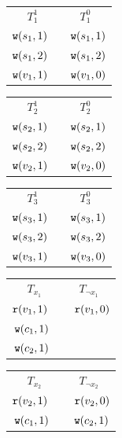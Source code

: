\begin{table}[h]
    
\noindent
\begin{minipage}{0.15\textwidth}
\centering
\begin{tabular}{c | c}
    $T_1^1$ & $T_1^0$ \\
    $\mathtt{w}(s_1,1)$~& ~$\mathtt{w}(s_1,1)$ \\ 
    $\mathtt{w}(s_1,2)$~& ~$\mathtt{w}(s_1,2)$ \\ 
    $\mathtt{w}(v_1, 1)$~& ~$\mathtt{w}(v_1, 0)$ \\

\end{tabular}
\vspace{.1cm}

\begin{tabular}{c | c}
    $T_2^1$ & $T_2^0$ \\
    $\mathtt{w}(s_2,1)$~& ~$\mathtt{w}(s_2,1)$ \\ 
    $\mathtt{w}(s_2,2)$~& ~$\mathtt{w}(s_2,2)$ \\ 
    $\mathtt{w}(v_2, 1)$~& ~$\mathtt{w}(v_2, 0)$ \\
\end{tabular}
\vspace{.1cm}

\begin{tabular}{c | c}
    $T_3^1$ & $T_3^0$ \\
    $\mathtt{w}(s_3,1)$~& ~$\mathtt{w}(s_3,1)$ \\ 
    $\mathtt{w}(s_3,2)$~& ~$\mathtt{w}(s_3,2)$ \\ 
    $\mathtt{w}(v_3, 1)$~& ~$\mathtt{w}(v_3, 0)$ \\
   
\end{tabular}

\end{minipage}
\hfill
\begin{minipage}{0.15\textwidth}
\centering
\centering
\begin{tabular}{c | c}
    $T_{x_1}$ & $T_{\neg x_1}$ \\
    $\mathtt{r}(v_1,1)$ ~& ~$\mathtt{r}(v_1,0)$ \\ 
    $\mathtt{w}(c_1,1)$~ &  \\ 
    $\mathtt{w}(c_2, 1)$~&  \\

\end{tabular}
\vspace{.1cm}

\begin{tabular}{c | c}
   $T_{x_2}$ & $T_{\neg x_2}$ \\
    $\mathtt{r}(v_2,1)$ ~& ~$\mathtt{r}(v_2,0)$ \\ 
    $\mathtt{w}(c_1,1)$~ & ~$\mathtt{w}(c_2,1)$ \\ 
    

\end{tabular}
\end{minipage}
\end{table}
